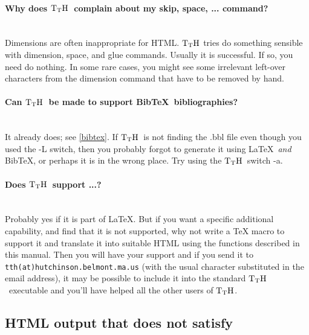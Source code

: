 \documentclass[12pt]{article}
\def\TtH{$\rm{}T_TH$}
\begin{document}
\paragraph{Why does \TtH\ complain about my skip, space, ... command?}\leavevmode\\ 
Dimensions are often inappropriate for HTML. \TtH
tries do something sensible with dimension, space, and glue
commands. Usually it is successful. If so, you need do nothing. In
some rare cases, you might see some irrelevant left-over characters
from the dimension command that have to be removed by hand.

\paragraph{Can \TtH\ be made to support Bib\TeX\ bibliographies?}\leavevmode\\
It already does; see \ref{bibtex}. If \TtH\ is not finding the .bbl file
even though you used the -L switch, then you probably forgot to
generate it using \LaTeX\ \emph{and} Bib\TeX, or perhaps it is in the
wrong place. Try using the \TtH\ switch -a.  

\paragraph{Does \TtH\ support ...?}\leavevmode\\ Probably yes if it is part
of \LaTeX. But if you want a specific additional capability, and find
that it is not supported, why not write a TeX macro to support it and
translate it into suitable HTML using the functions described in this
manual. Then you will have your support and if you send it to
\verb!tth(at)hutchinson.belmont.ma.us! (with the usual character
substituted in the email address), it may be possible to include it
into the standard \TtH\ executable and you'll have helped all the
other users of \TtH.

\subsection{HTML output that does not satisfy}

\label{headbody}
\end{document}
